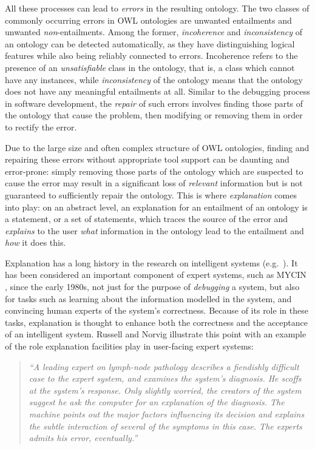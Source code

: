 All these processes can lead to \emph{errors} in the resulting ontology. The two classes of commonly occurring errors in OWL ontologies are unwanted entailments and unwanted \emph{non}-entailments. Among the former, \emph{incoherence} and \emph{inconsistency} of an ontology can be detected automatically, as they have distinguishing logical features while also being reliably connected to errors. Incoherence refers to the presence of an \emph{unsatisfiable} class in the ontology, that is, a class which cannot have any instances, while \emph{inconsistency} of the ontology means that the ontology does not have any meaningful entailments at all. Similar to the debugging process in software development, the \emph{repair} of such errors involves finding those parts of the ontology that cause the problem, then modifying or removing them in order to rectify the error. 

Due to the large size and often complex structure of OWL ontologies, finding and repairing these errors without appropriate tool support can be daunting and error-prone: simply removing those parts of the ontology which are suspected to cause the error may result in a significant loss of \emph{relevant} information but is not guaranteed to sufficiently repair the ontology. This is where \emph{explanation} comes into play: on an abstract level, an explanation for an entailment of an ontology is a statement, or a set of statements, which traces the source of the error and \emph{explains} to the user \emph{what} information in the ontology lead to the entailment and \emph{how} it does this. 

Explanation has a long history in the research on intelligent systems (e.g.\ \cite{clancey81mg,buchanan84zb}). It has been considered an important component of expert systems, such as MYCIN \cite{buchanan84lq}, since the early 1980s, not just for the purpose of \emph{debugging} a system, but also for tasks such as learning about the information modelled in the system, and convincing human experts of the system's correctness. Because of its role in these tasks, explanation is thought to enhance both the correctness and the acceptance of an intelligent system. Russell and Norvig \cite{russell03aa} illustrate this point with an example of the role explanation facilities play in user-facing expert systems:

\begin{quote}
\emph{\enquote{A leading expert on lymph-node pathology describes a fiendishly difficult case to the expert system, and examines the system's diagnosis. He scoffs at the system's response. Only slightly worried, the creators of the system suggest he ask the computer for an explanation of the diagnosis. The machine points out the major factors influencing its decision and explains the subtle interaction of several of the symptoms in this case. The experts admits his error, eventually.}}
\end{quote}

